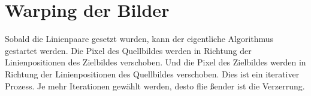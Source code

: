 \chapter{Warping der Bilder}

Sobald die Linienpaare gesetzt wurden, kann der eigentliche Algorithmus gestartet werden. Die Pixel
des Quellbildes werden in Richtung der Linienpositionen des Zielbildes verschoben. Und die Pixel
des Zielbildes werden in Richtung der Linienpositionen des Quellbildes verschoben.
Dies ist ein iterativer Prozess. Je mehr Iterationen gewählt werden, desto flie \ss ender ist
die Verzerrung.
